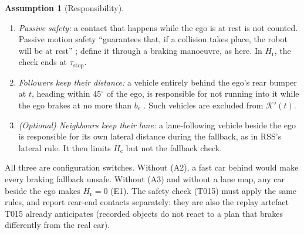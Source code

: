 \documentclass[11pt]{article}
\theoremstyle{definition}
\newtheorem{assumption}{Assumption}
\theoremstyle{remark}
\newcommand{\Hc}{H_{\mathrm{c}}}
\newcommand{\Hr}{H_{\mathrm{r}}}
\begin{document}
\begin{assumption}[Responsibility]\label{ass:resp}
\begin{enumerate}[label=(A\arabic*),leftmargin=*]
  \item \emph{Passive safety:} a contact that happens while the ego is at rest is not counted. Passive
    motion safety ``guarantees that, if a collision takes place, the robot will be at rest''
    \cite{bouraine2012}; \cite{macek2009} define it through a braking manoeuvre, as here. In $\Hr$, the
    check ends at $\tau_{\mathrm{stop}}$.
  \item \emph{Followers keep their distance:} a vehicle entirely behind the ego's rear bumper at $t$,
    heading within $45^\circ$ of the ego, is responsible for not running into it while the ego brakes at
    no more than $b_e$ \cite{rss2017}. Such vehicles are excluded from $\mathcal K'(t)$.
  \item \emph{(Optional) Neighbours keep their lane:} a lane-following vehicle beside the ego is
    responsible for its own lateral distance during the fallback, as in RSS's lateral rule. It then limits
    $\Hc$ but not the fallback check.
\end{enumerate}
\end{assumption}
All three are configuration switches. Without (A2), a fast car behind would make every braking fallback
unsafe. Without (A3) and without a lane map, any car beside the ego makes $\Hr=0$ (E1). The safety check
(T015) must apply the same rules, and report rear-end contacts separately: they are also the replay
artefact T015 already anticipates (recorded objects do not react to a plan that brakes differently from
the real car).
\end{document}
